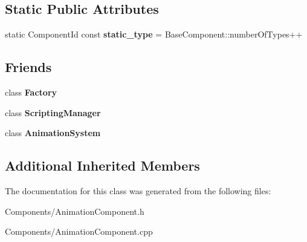 \subsection*{Static Public Attributes}
\begin{DoxyCompactItemize}
\item 
\mbox{\label{classAnimationComponent_afd0771d0bf533c347cb80f0343ec747b}} 
static Component\+Id const {\bfseries static\+\_\+type} = Base\+Component\+::number\+Of\+Types++
\end{DoxyCompactItemize}
\subsection*{Friends}
\begin{DoxyCompactItemize}
\item 
\mbox{\label{classAnimationComponent_a328c093d609680cca505905c6d49901a}} 
class {\bfseries Factory}
\item 
\mbox{\label{classAnimationComponent_ab3d6fafb2064bace492fd6b503d044f4}} 
class {\bfseries Scripting\+Manager}
\item 
\mbox{\label{classAnimationComponent_a4c8fb761c777f1a874c5d97e052686ad}} 
class {\bfseries Animation\+System}
\end{DoxyCompactItemize}
\subsection*{Additional Inherited Members}


The documentation for this class was generated from the following files\+:\begin{DoxyCompactItemize}
\item 
Components/Animation\+Component.\+h\item 
Components/Animation\+Component.\+cpp\end{DoxyCompactItemize}

